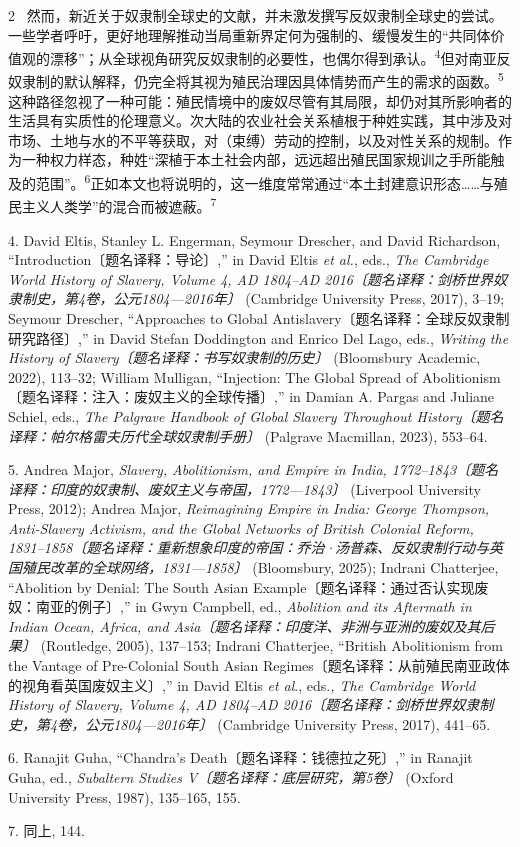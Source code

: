 \documentclass[10pt,a4paper]{article}
\begin{document}
\begin{paracol}{2}
\switchcolumn*
{\scriptsize\color{gray} [p. 2]}\ 然而，新近关于奴隶制全球史的文献，并未激发撰写反奴隶制全球史的尝试。一些学者呼吁，更好地理解推动当局重新界定何为强制的、缓慢发生的“共同体价值观的漂移”；从全球视角研究反奴隶制的必要性，也偶尔得到承\mbox{认。\textsuperscript{4}}但对南亚反奴隶制的默认解释，仍完全将其视为殖民治理因具体情势而产生的需求的函\mbox{数。\textsuperscript{5}}这种路径忽视了一种可能：殖民情境中的废奴尽管有其局限，却仍对其所影响者的生活具有实质性的伦理意义。次大陆的农业社会关系植根于种姓实践，其中涉及对市场、土地与水的不平等获取，对（束缚）劳动的控制，以及对性关系的规制。作为一种权力样态，种姓“深植于本土社会内部，远远超出殖民国家规训之手所能触及的范围”。\nobreak\textsuperscript{6}正如本文也将说明的，这一维度常常通过“本土封建意识形态……与殖民主义人类学”的混合而被遮\mbox{蔽。\textsuperscript{7}}\par{\small 4. David Eltis, Stanley L. Engerman, Seymour Drescher, and David Richardson, “Introduction〔题名译释：导论〕,” in David Eltis \textit{et al.}, eds., \textit{The Cambridge World History of Slavery, Volume 4, AD 1804–AD 2016〔题名译释：剑桥世界奴隶制史，第4卷，公元1804—2016年〕} (Cambridge University Press, 2017), 3–19; Seymour Drescher, “Approaches to Global Antislavery〔题名译释：全球反奴隶制研究路径〕,” in David Stefan Doddington and Enrico Del Lago, eds., \textit{Writing the History of Slavery〔题名译释：书写奴隶制的历史〕} (Bloomsbury Academic, 2022), 113–32; William Mulligan, “Injection: The Global Spread of Abolitionism〔题名译释：注入：废奴主义的全球传播〕,” in Damian A. Pargas and Juliane Schiel, eds., \textit{The Palgrave Handbook of Global Slavery Throughout History〔题名译释：帕尔格雷夫历代全球奴隶制手册〕} (Palgrave Macmillan, 2023), 553–64.\par}{\small 5. Andrea Major, \textit{Slavery, Abolitionism, and Empire in India, 1772–1843〔题名译释：印度的奴隶制、废奴主义与帝国，1772—1843〕} (Liverpool University Press, 2012); Andrea Major, \textit{Reimagining Empire in India: George Thompson, Anti-Slavery Activism, and the Global Networks of British Colonial Reform, 1831–1858〔题名译释：重新想象印度的帝国：乔治·汤普森、反奴隶制行动与英国殖民改革的全球网络，1831—1858〕} (Bloomsbury, 2025); Indrani Chatterjee, “Abolition by Denial: The South Asian Example〔题名译释：通过否认实现废奴：南亚的例子〕,” in Gwyn Campbell, ed., \textit{Abolition and its Aftermath in Indian Ocean, Africa, and Asia〔题名译释：印度洋、非洲与亚洲的废奴及其后果〕} (Routledge, 2005), 137–153; Indrani Chatterjee, “British Abolitionism from the Vantage of Pre-Colonial South Asian Regimes〔题名译释：从前殖民南亚政体的视角看英国废奴主义〕,” in David Eltis \textit{et al}., eds.\textit{, The Cambridge World History of Slavery, Volume 4, AD 1804–AD 2016〔题名译释：剑桥世界奴隶制史，第4卷，公元1804—2016年〕} (Cambridge University Press, 2017), 441–65.\par}{\small 6. Ranajit Guha, “Chandra’s Death〔题名译释：钱德拉之死〕,” in Ranajit Guha, ed., \textit{Subaltern Studies V〔题名译释：底层研究，第5卷〕} (Oxford University Press, 1987), 135–165, 155.\par}{\small 7. 同上, 144.\par}

\end{paracol}
\end{document}
